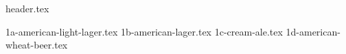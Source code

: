 \clearpage
{}
\divisorLine
{header.tex}
\begin{multicols}{2}
{1a-american-light-lager.tex}
{1b-american-lager.tex}
{1c-cream-ale.tex}
{1d-american-wheat-beer.tex}
\end{multicols}